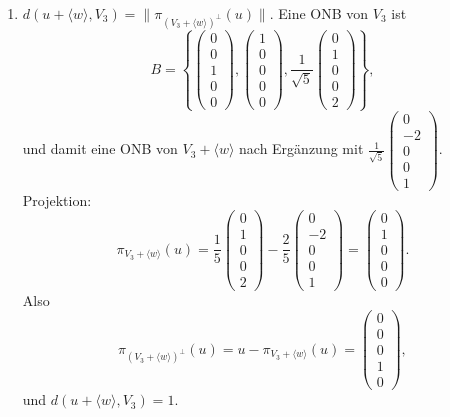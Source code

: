 \documentclass[11pt, a4paper]{article}
\begin{document}
\begin{enumerate}
  \item
  $d(u+\langle w\rangle,V_3)=\|\pi_{(V_3+\langle w\rangle)^\perp}(u)\|$.
  Eine ONB von $V_3$ ist
  \[
  B=\left\{\begin{pmatrix}0\\0\\1\\0\\0\end{pmatrix},
  \begin{pmatrix}1\\0\\0\\0\\0\end{pmatrix},
  \frac{1}{\sqrt5}\begin{pmatrix}0\\1\\0\\0\\2\end{pmatrix}\right\},
  \]
  und damit eine ONB von $V_3+\langle w\rangle$ nach Ergänzung mit
  $\frac{1}{\sqrt5}\begin{pmatrix}0\\-2\\0\\0\\1\end{pmatrix}$.
  Projektion:
  \[
  \pi_{V_3+\langle w\rangle}(u)
  =\frac{1}{5}\begin{pmatrix}0\\1\\0\\0\\2\end{pmatrix}
  -\frac{2}{5}\begin{pmatrix}0\\-2\\0\\0\\1\end{pmatrix}
  =\begin{pmatrix}0\\1\\0\\0\\0\end{pmatrix}.
  \]
  Also
  \[
  \pi_{(V_3+\langle w\rangle)^\perp}(u)
  =u-\pi_{V_3+\langle w\rangle}(u)
  =\begin{pmatrix}0\\0\\0\\1\\0\end{pmatrix},
  \]
  und $d(u+\langle w\rangle,V_3)=1$.


\end{enumerate}
\end{document}
